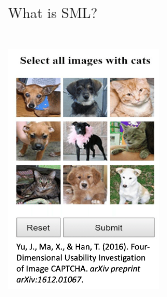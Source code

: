 \documentclass[handout]{beamer}
\begin{document}
	
	\begin{frame}{What is SML?}
		
		\begin{center}
			\includegraphics[width=4cm, height=7cm]{../pictures/CAPTCHA.png} 
		\end{center}
		
		
		
	\end{frame}
	
\end{document}
